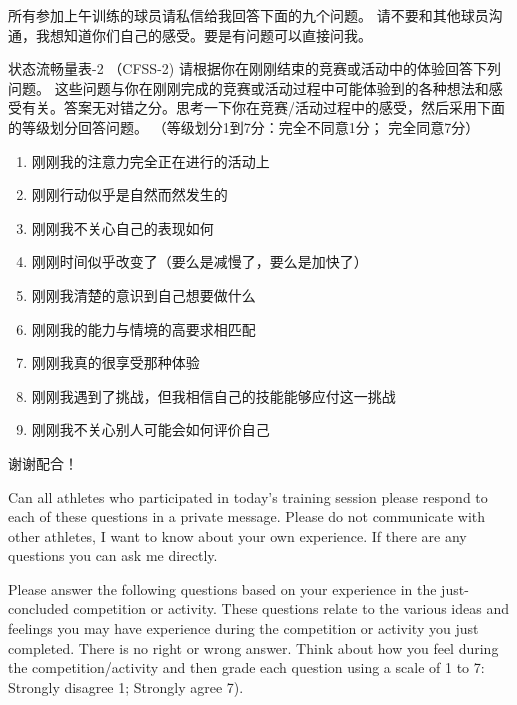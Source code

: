 \begin{CJK}{UTF8}{gbsn}

        所有参加上午训练的球员请私信给我回答下面的九个问题。
        请不要和其他球员沟通，我想知道你们自己的感受。要是有问题可以直接问我。


        状态流畅量表-2 （CFSS-2)
        请根据你在刚刚结束的竞赛或活动中的体验回答下列问题。 这些问题与你在刚刚完成的竞赛或活动过程中可能体验到的各种想法和感受有关。答案无对错之分。思考一下你在竞赛/活动过程中的感受，然后采用下面的等级划分回答问题。  （等级划分1到7分：完全不同意1分； 完全同意7分）

        \begin{enumerate}
          \item 刚刚我的注意力完全正在进行的活动上
          \item 刚刚行动似乎是自然而然发生的
          \item 刚刚我不关心自己的表现如何
          \item 刚刚时间似乎改变了（要么是减慢了，要么是加快了）
          \item 刚刚我清楚的意识到自己想要做什么
          \item 刚刚我的能力与情境的高要求相匹配
          \item 刚刚我真的很享受那种体验
          \item 刚刚我遇到了挑战，但我相信自己的技能能够应付这一挑战
          \item 刚刚我不关心别人可能会如何评价自己
        \end{enumerate}

          谢谢配合！

    Can all athletes who participated in today's training session please respond to each of these questions in a private message. Please do not communicate with other athletes, I want to know about your own experience.  If there are any questions you can ask me directly.

    Please answer the following questions based on your experience in the just-concluded competition or activity. These questions relate to the various ideas and feelings you may have experience during the competition or activity you just completed. There is no right or wrong answer. Think about how you feel during the competition/activity and then grade each question using a scale of 1 to 7: Strongly disagree 1; Strongly agree 7).



\end{CJK}
